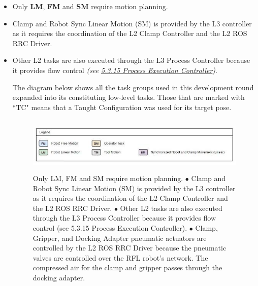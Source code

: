 \documentclass[11pt]{book}
\begin{document}
\begin{itemize}
	\item Only \textbf{LM}, \textbf{FM }and \textbf{SM }require motion planning. 

	\item Clamp and Robot Sync Linear Motion (SM) is provided by the L3 controller as it requires the coordination of the L2 Clamp Controller and the L2 ROS RRC Driver. 

	\item Other L2 tasks are also executed through the L3 Process Controller because it provides flow control \textit{\textcolor[HTML]{B7B7B7}{(see \uline{5.3.15 Process Execution Controller})}}. 

The diagram below shows all the task groups used in this development round expanded into its constituting low-level tasks. Those that are marked with ``TC" means that a Taught Configuration was used for its target pose.

\begin{figure}[H]
\includegraphics[width=14.0cm,height=2.7cm]{./images/image19.jpeg}
\caption{Only LM, FM and SM require motion planning. $\bullet$ Clamp and Robot Sync Linear Motion (SM) is provided by the L3 controller as it requires the coordination of the L2 Clamp Controller and the L2 ROS RRC Driver. $\bullet$ Other L2 tasks are also executed through the L3 Process Controller because it provides flow control (see 5.3.15 Process Execution Controller). $\bullet$ Clamp, Gripper, and Docking Adapter pneumatic actuators are controlled by the L2 ROS RRC Driver because the pneumatic valves are controlled over the RFL robot's network. The compressed air for the clamp and gripper passes through the docking adapter.}
\label{fig:only_lm_fm_and_sm}
\end{figure}



\end{itemize}
\end{document}
